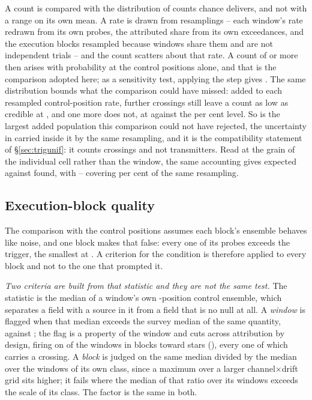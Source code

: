 A count is compared with the distribution of counts chance delivers, and
not with a range on its own mean. A rate is drawn from \CeNBoot{} resamplings
-- each window's rate redrawn from its own \NCtrl{} probes, the attributed
share from its own \CeNExc{} exceedances, and the execution blocks resampled
because windows share them and are not independent trials -- and the count
scatters about that rate. A count of \CeObs{} or more then arises with
probability \CeProbNull{} at the control positions alone, and that is the
comparison adopted here; as a sensitivity test, applying the step gives
\CeProbStep. The same distribution bounds what the comparison could have
missed: added to each resampled control-position rate, \CeAddLim{} further
crossings still leave a count as low as \CeObs{} credible at \CeProbAtLim,
and one more does not, at \CeProbAboveLim{} against the \CeAlphaPct{} per
cent level. So \CeAddLim{} is the largest added population this comparison
could not have rejected, the uncertainty in \CeExp{} carried inside it by the
same resampling, and it is the compatibility statement of
\S\ref{sec:trigunif}: it counts crossings and not transmitters. Read at the grain of
the individual cell rather than the window, the same accounting gives
\CkExp{} expected against \CkNObs{} found, with \CkLo--\CkHi{} covering
\CeCovPct{} per cent of the same resampling.

\subsection{Execution-block quality}
\label{sec:blockquality}

The comparison with the control positions assumes each block's ensemble
behaves like noise, and one block makes that false: every one of its \NCtrl{}
probes exceeds the trigger, the smallest at \BqFailCtrlMin. A criterion for
the condition is therefore applied to every block and not to the one that
prompted it.

\emph{Two criteria are built from that statistic and they are not the same
test.} The statistic is the median of a window's own \NCtrl-position control
ensemble, which separates a field with a source in it from a field that is no
null at all. A \emph{window} is flagged when that median exceeds \BqFactor{}
the survey median of the same quantity, \DqThresh{} against \DqSurvMed; the
flag is a property of the window and cuts across attribution by design,
firing on \DqNWin{} of the \NWindows{} windows in \BkFlagNBlock{} blocks
toward \DqNStar{} stars (\DqStars), every one of which carries a crossing.
A \emph{block} is judged on the same median divided by the median over the
windows of its own class, since a maximum over a larger channel$\times$drift
grid sits higher; it fails where the median of that ratio over its windows
exceeds \BqFactor{} the scale of its class. The factor is the same in both.

